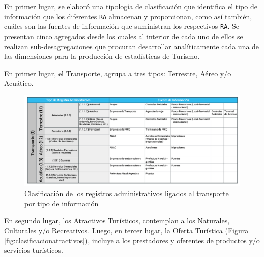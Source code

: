 \documentclass[
]{book}
\begin{document}
En primer lugar, se elaboró una tipología de clasificación que identifica el tipo de información que los diferentes \texttt{RA} almacenan y proporcionan, como así también, cuáles son las fuentes de información que suministran los respectivos \texttt{RA}. Se presentan cinco agregados desde los cuales al interior de cada uno de ellos se realizan sub-desagregaciones que procuran desarrollar analíticamente cada una de las dimensiones para la producción de estadísticas de Turismo.

En primer lugar, el Transporte, agrupa a tres tipos: Terrestre, Aéreo y/o Acuático.

\begin{figure}

{\centering \includegraphics[width=1\linewidth]{imagenes/figura03A} 

}

\caption{Clasificación de los registros administrativos ligados al transporte por tipo de información}\label{fig:clasificaciontransporte}
\end{figure}

En segundo lugar, los Atractivos Turísticos, contemplan a los Naturales, Culturales y/o Recreativos. Luego, en tercer lugar, la Oferta Turística (Figura \ref{fig:clasificacionatractivos}), incluye a los prestadores y oferentes de productos y/o servicios turísticos.
\end{document}
